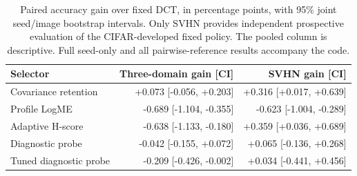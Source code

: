 \begin{table}[tb]\centering\small
\caption{Paired accuracy gain over fixed DCT, in percentage points, with 95\% joint seed/image bootstrap intervals. Only SVHN provides independent prospective evaluation of the CIFAR-developed fixed policy. The pooled column is descriptive. Full seed-only and all pairwise-reference results accompany the code.}\label{tab:paired}
\begin{tabular}{lrr}\toprule
Selector & Three-domain gain [CI] & SVHN gain [CI]\\\midrule
Covariance retention & +0.073 [-0.056, +0.203] & +0.316 [+0.017, +0.639]\\
Profile LogME & -0.689 [-1.104, -0.355] & -0.623 [-1.004, -0.289]\\
Adaptive H-score & -0.638 [-1.133, -0.180] & +0.359 [+0.036, +0.689]\\
Diagnostic probe & -0.042 [-0.155, +0.072] & +0.065 [-0.136, +0.268]\\
Tuned diagnostic probe & -0.209 [-0.426, -0.002] & +0.034 [-0.441, +0.456]\\
\bottomrule\end{tabular}
\end{table}
